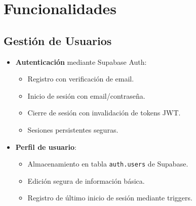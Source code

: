\section{Funcionalidades}
\subsection{Gestión de Usuarios}
\begin{itemize}
    \item \textbf{Autenticación} mediante Supabase Auth:
    \begin{itemize}
        \item Registro con verificación de email.
        \item Inicio de sesión con email/contraseña.
        \item Cierre de sesión con invalidación de tokens JWT.
        \item Sesiones persistentes seguras.
    \end{itemize}
    
    \item \textbf{Perfil de usuario}:
    \begin{itemize}
        \item Almacenamiento en tabla \texttt{auth.users} de Supabase.
        \item Edición segura de información básica.
        \item Registro de último inicio de sesión mediante triggers.
    \end{itemize}
\end{itemize}

